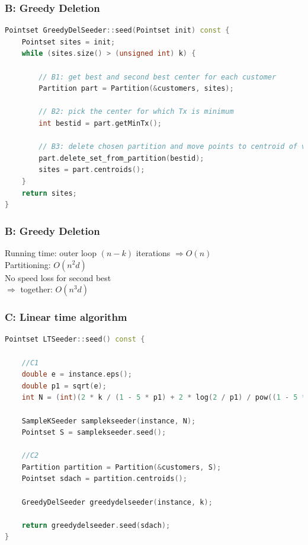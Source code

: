 \documentclass{beamer}
\begin{document}
  \begin{frame}[fragile]
    \frametitle{B: Greedy Deletion}
\begin{lstlisting}[language=C++]
Pointset GreedyDelSeeder::seed(Pointset init) const {
	Pointset sites = init;
	while (sites.size() > (unsigned int) k) {

		// B1: get best and second best center for each customer
		Partition part = Partition(&customers, sites);

		// B2: pick the center for which Tx is minimum
		int bestid = part.getMinTx();

		// B3: delete chosen partition and move points to centroid of voronoi region
		part.delete_set_from_partition(bestid);
		sites = part.centroids();
	}
	return sites;
}
\end{lstlisting}
\end{frame}



  \begin{frame}
    \frametitle{B: Greedy Deletion}
    Running time: outer loop $(n-k)$ iterations $\Rightarrow O(n)$\\
    Partitioning: $O(n^2d)$\\
    No speed loss for second best\\
    $\Rightarrow$ together: $O(n^3d)$
  \end{frame}

  
    \begin{frame}[fragile]

    \frametitle{C: Linear time algorithm}
\begin{lstlisting}[language=C++]
Pointset LTSeeder::seed() const {

	//C1
	double e = instance.eps();
	double p1 = sqrt(e);
	int N = (int)(2 * k / (1 - 5 * p1) + 2 * log(2 / p1) / pow((1 - 5 * p1), 2));

	SampleKSeeder samplekseeder(instance, N);
	Pointset S = samplekseeder.seed();

	//C2
	Partition partition = Partition(&customers, S);
	Pointset sdach = partition.centroids();

	GreedyDelSeeder greedydelseeder(instance, k);

	return greedydelseeder.seed(sdach);
}
\end{lstlisting}
\end{frame}
\end{document}
